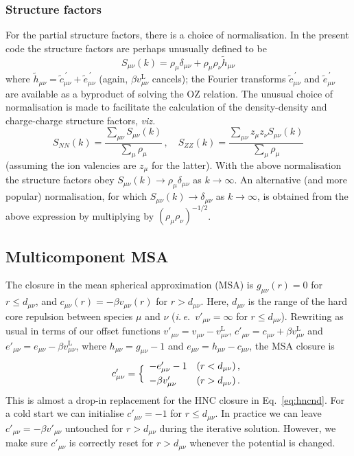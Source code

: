 \documentclass[12pt,a4paper]{article}
\newcommand{\latin}[1]{\emph{#1}}
\newcommand{\ie}{\latin{i.\,e.}}
\newcommand{\viz}{\latin{viz.}}
\newcommand{\lr}{^{\mathrm{L}}}
\newcommand{\myprime}{^{{}\,\prime}}
\newcommand{\Eqref}[1]{Eq.~\eqref{#1}}
\begin{document}
\subsubsection{Structure factors}
%
For the partial structure factors, there is a choice of normalisation.
In the present code the structure factors are perhaps unusually
defined to be
%
\begin{equation}
S_{\mu\nu}(k) = \rho_\mu\delta_{\mu\nu} + \rho_\mu\rho_\nu{\tilde
  h}_{\mu\nu}
\label{eq:skdef}
\end{equation}
%
where ${\tilde h}_{\mu\nu}={\tilde c}_{\mu\nu}\myprime + {\tilde
  e}_{\mu\nu}\myprime$ (again, $\beta v_{\mu\nu}\lr$ cancels); the
Fourier transforms ${\tilde c}_{\mu\nu}\myprime$ and ${\tilde
  e}_{\mu\nu}\myprime$ are available as a byproduct of solving the OZ
relation.  The unusual choice of normalisation is made to facilitate
the calculation of the density-density and charge-charge structure
factors, \viz\
%
\begin{equation}
  S_{NN}(k) = \frac{\sum_{\mu\nu}S_{\mu\nu}(k)}{\sum_\mu\rho_\mu}\,,\quad
  S_{ZZ}(k) = \frac{\sum_{\mu\nu}z_\mu z_\nu S_{\mu\nu}(k)}{\sum_\mu\rho_\mu}
  \label{eq:snnszz}
\end{equation}
%
(assuming the ion valencies are $z_\mu$ for the latter).
With the above normalisation the structure factors obey
$S_{\mu\nu}(k)\to\rho_\mu\delta_{\mu\nu}$ as $k\to\infty$.  An
alternative (and more popular) normalisation, for which
$S_{\mu\nu}(k)\to\delta_{\mu\nu}$ as $k\to\infty$, is obtained from
the above expression by multiplying by $({\rho_\mu\rho_\nu})^{-1/2}$.

\subsection{Multicomponent MSA}
%
The closure in the mean spherical approximation (MSA) is
$g_{\mu\nu}(r)=0$ for $r\le d_{\mu\nu}$, and $c_{\mu\nu}(r)= -\beta
v_{\mu\nu}(r)$ for $r> d_{\mu\nu}$.  Here, $d_{\mu\nu}$ is the range
of the hard core repulsion between species $\mu$ and $\nu$
(\ie\ $v'_{\mu\nu}=\infty$ for $r\le d_{\mu\nu}$).  Rewriting as usual
in terms of our offset functions
$v'_{\mu\nu}=v_{\mu\nu}-v\lr_{\mu\nu}$, $c'_{\mu\nu}=c_{\mu\nu}+\beta
v\lr_{\mu\nu}$ and $e'_{\mu\nu}=e_{\mu\nu}-\beta v\lr_{\mu\nu}$, where
$h_{\mu\nu}=g_{\mu\nu}-1$ and $e_{\mu\nu}=h_{\mu\nu}-c_{\mu\nu}$, the
MSA closure is
%
\begin{equation}
  c'_{\mu\nu}=\Bigl\{\begin{array}{ll}
  -e'_{\mu\nu}-1 & (r<d_{\mu\nu})\,,\\[3pt]
  -\beta v'_{\mu\nu} & (r>d_{\mu\nu})\,.
  \end{array}
\end{equation}
%
This is almost a drop-in replacement for the HNC closure in
\Eqref{eq:hncnd}.  For a cold start we can initialise $c'_{\mu\nu}=-1$
for $r\le d_{\mu\nu}$.  In practice we can leave $c'_{\mu\nu}=-\beta
v'_{\mu\nu}$ untouched for $r>d_{\mu\nu}$ during the iterative
solution.  However, we make sure $c'_{\mu\nu}$ is correctly reset for
$r>d_{\mu\nu}$ whenever the potential is changed.
\end{document}
